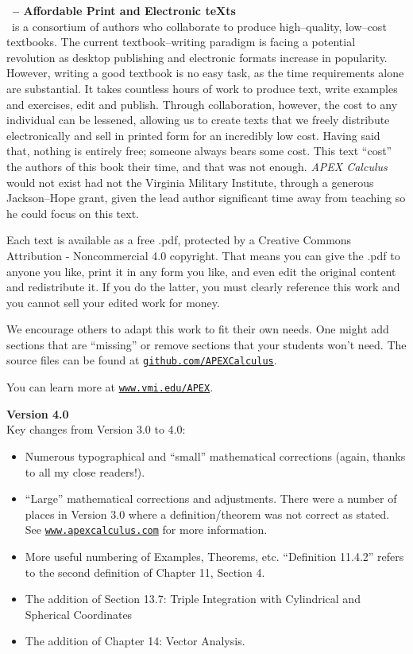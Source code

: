 \clearpage
\noindent\textbf{\large \apex\  -- Affordable Print and Electronic teXts}\\

\apex\ is a consortium of authors  who collaborate to produce high--quality, low--cost textbooks. The current textbook--writing paradigm is facing a potential revolution as desktop publishing and electronic formats increase in popularity. However, writing a good textbook is no easy task, as the time requirements alone are substantial. It takes countless hours of work to produce text, write examples and exercises, edit and publish. Through collaboration, however, the cost to any individual can be lessened, allowing us to create texts that we freely distribute electronically and sell in printed form for an incredibly low cost. Having said that, nothing is entirely free; someone always bears some cost. This text ``cost'' the authors of this book their time, and that was not enough. \textit{APEX Calculus} would not exist had not the Virginia Military Institute, through a generous Jackson--Hope grant, given the lead author significant time away from teaching so he could focus on this text.

Each text is available as a free .pdf, protected by a Creative Commons Attribution - Noncommercial 4.0 copyright. That  means you can give the .pdf to anyone you like, print it in any form you like, and even edit the original content and redistribute it. If you do the latter, you must  clearly reference this work and you cannot sell your edited work for money.

We encourage others to adapt this work to fit their own needs. One might add sections that are ``missing'' or remove sections that your students won't need. The source files can be found at \texttt{\href{https://github.com/APEXCalculus}{github.com/APEXCalculus}}.

You can learn more at \texttt{\href{http://www.vmi.edu/APEX}{www.vmi.edu/APEX}}.

\bigskip

\noindent\textbf{\large Version 4.0}\\

Key changes from Version 3.0 to 4.0:
\begin{itemize}
	\item Numerous typographical and ``small'' mathematical corrections (again, thanks to all my close readers!).
	\item	``Large'' mathematical corrections and adjustments. There were a number of places in Version 3.0 where a definition/theorem was not correct as stated. See \texttt{\href{http://apexcalculus.com}{www.apexcalculus.com}} for more information.
	\item More useful numbering of Examples, Theorems, etc. ``Definition 11.4.2'' refers to the second definition of Chapter 11, Section 4. 
	\item	The addition of Section 13.7: Triple Integration with Cylindrical and Spherical Coordinates
	\item	The addition of Chapter 14: Vector Analysis.
\end{itemize}
\thispagestyle{empty}

